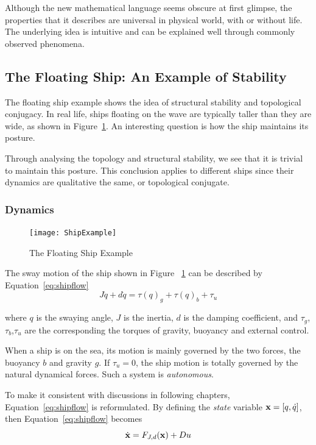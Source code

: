 Although the new mathematical language seems obscure at first glimpse, the properties that it describes are universal in physical world, with or without life.
The underlying idea is intuitive and can be explained well through commonly observed phenomena.



\subsection{The Floating Ship: An Example of Stability}
The floating ship  example shows the idea of structural stability and topological conjugacy.
In real life, ships floating on the wave are typically taller than they are wide, as shown in Figure~\ref{fig:ShipFloating}.
An interesting  question is how the ship maintains its posture.

Through analysing the topology and structural stability, we see that it is trivial to maintain this posture.
This conclusion applies to different ships since their dynamics are qualitative the same, or topological conjugate.


\subsubsection*{Dynamics}

\begin{figure}[!htbp]
  \begin{center}
    \texttt{[image: ShipExample]}
    \caption{The Floating Ship Example}
    \label{fig:ShipFloating}
  \end{center}
\end{figure}

The sway motion of the ship shown in Figure ~\ref{fig:ShipFloating} can be described by Equation~\ref{eq:shipflow}
\begin{equation}
\label{eq:shipflow}
J\ddot{q}+d\dot{q}=\tau(q)_{g}+\tau(q)_{b}+\tau_{u}
\end{equation}


where $q$ is the swaying angle,
$J$ is the inertia,  
$d$ is the damping coefficient,
and $\tau_{g}$,$\tau_{b}$,$\tau_{u}$ are the corresponding the torques of gravity, buoyancy and external control.

When a ship is on the sea, its motion is mainly governed by the two forces, the buoyancy $b$ and gravity $g$.
If $\tau_{u}=0$,  the ship motion is totally governed by the natural dynamical forces.
Such a system is \emph{autonomous}.

To make it consistent with discussions in following chapters, Equation~\ref{eq:shipflow} is reformulated.
By defining the \emph{state} variable $\mathbf{x}=[q,\dot{q}]$, then Equation~\ref{eq:shipflow} becomes
\[
\dot{\mathbf{x}}=F_{J,d}(\mathbf{x})+Du
\]

